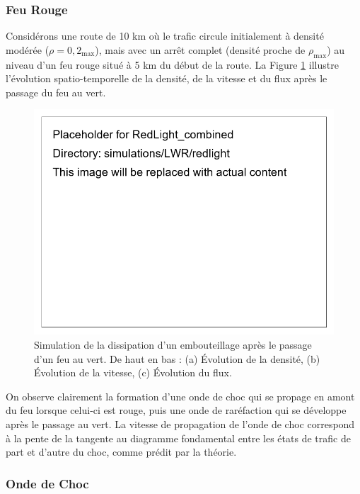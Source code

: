 \subsubsection{Feu Rouge}
\label{subsubsec:feu_rouge}

Considérons une route de 10 km où le trafic circule initialement à densité modérée ($\rho = 0,2$\rho$_{\max}$), mais avec un arrêt complet (densité proche de $\rho_{\max}$) au niveau d'un feu rouge situé à 5 km du début de la route. La Figure \ref{fig:feu_rouge} illustre l'évolution spatio-temporelle de la densité, de la vitesse et du flux après le passage du feu au vert.

\begin{figure}[htbp]
\centering
\includegraphics[width=1.0\textwidth]{simulations/LWR/redlight/RedLight_combined}
\caption{Simulation de la dissipation d'un embouteillage après le passage d'un feu au vert. De haut en bas : (a) Évolution de la densité, (b) Évolution de la vitesse, (c) Évolution du flux.}
\label{fig:feu_rouge}
\end{figure}

On observe clairement la formation d'une onde de choc qui se propage en amont du feu lorsque celui-ci est rouge, puis une onde de raréfaction qui se développe après le passage au vert. La vitesse de propagation de l'onde de choc correspond à la pente de la tangente au diagramme fondamental entre les états de trafic de part et d'autre du choc, comme prédit par la théorie.

\subsubsection{Onde de Choc}
\label{subsubsec:onde_choc_sim}

